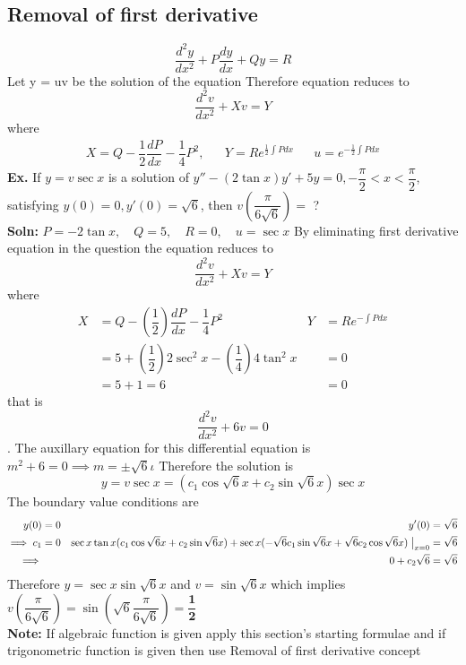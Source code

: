 \documentclass[a4paper, titlepage]{article}
\newcommand*\circled[1]{\tikz[baseline=(char.base)]{
            \node[shape=circle,draw,inner sep=2pt] (char) {#1};}}
\begin{document}
\subsection{Removal of first derivative}
\begin{equation}
    \label{2deggeneqrod}
    \dfrac{d^2y}{dx^2} + P\dfrac{dy}{dx} + Qy = R
\end{equation}
Let y = uv be the solution of the equation \circled{\ref{2deggeneqrod}}
Therefore equation \circled{\ref{2deggeneqrod}} reduces to 
\[ \dfrac{d^2v}{dx^2} + Xv = Y \]
where 
\begin{align*}
    X = Q - \dfrac{1}{2}\dfrac{dP}{dx} - \dfrac{1}{4}P^2, &&
    Y = Re^{\frac{1}{2}\int Pdx} && 
    u = e^{-\frac{1}{2}\int Pdx}
\end{align*}
\textbf{Ex. } If $y = v\sec x$ is a solution of $y'' - (2\tan x) y' + 5y = 0, 
-\dfrac{\pi}{2} < x < \dfrac{\pi}{2}$, satisfying $y(0) = 0,
y'(0) = \sqrt{6}$, then $v\left( \dfrac{\pi}{6\sqrt{6}} \right) =$ ? \\
\textbf{Soln: } $P = -2\tan x, \quad Q = 5, \quad R = 0, \quad u = \sec x$ 
By eliminating first derivative equation in the question the
equation reduces to \[ \dfrac{d^2v}{dx^2} + Xv = Y \] where 
\begin{align*}
    X &= Q - \left( \dfrac{1}{2} \right)\dfrac{dP}{dx} - \dfrac{1}{4} P^2
    &
    Y &= Re^{-\int Pdx} \\
      &= 5 + \left( \dfrac{1}{2} \right) 2\sec^2 x - \left( \dfrac{1}{4} \right)4\tan^2 x
    &
      &= 0 \\
      &= 5 + 1 = 6
    &
      &= 0
\end{align*}
that is \[ \dfrac{d^2v}{dx^2} + 6v = 0 \]. The auxillary equation
for this differential equation is $m^2 + 6 = 0 \implies m = \pm\sqrt{6}\iota$
Therefore the solution is $$y = v\sec x = (c_1\cos \sqrt{6}x + c_2\sin \sqrt{6}x)\sec x$$  
The boundary value conditions are
\begin{align*}
    y(0) &= 0 & y'(0) &= \sqrt{6} \\
    \implies c_1 &= 0 & \sec x\tan x(c_1\cos \sqrt{6}x + c_2\sin \sqrt{6}x) + \sec x(-\sqrt{6}c_1\sin \sqrt{6}x + \sqrt{6}c_2\cos \sqrt{6}x) \bigm\vert_{x = 0} &= \sqrt{6} \\
    \implies & & 0 + c_2\sqrt{6} &= \sqrt{6}
\end{align*}
Therefore $y = \sec x \sin\sqrt{6}x$ and $v = \sin\sqrt{6}x$ which
implies $v\left( \dfrac{\pi}{6\sqrt{6}} \right) = \sin\left( \sqrt{6}\dfrac{\pi}{6\sqrt{6}} \right) = {\dfrac{\textbf{1}}{\textbf{2}}}$ \\
\textbf{Note: }If algebraic function is given apply this section's
starting formulae and if trigonometric function is given then use Removal of first derivative concept
\end{document}
